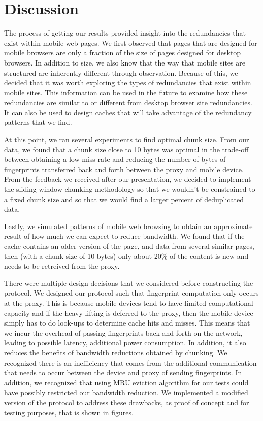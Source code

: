 \section{Discussion}
\label{sec:discussion}
The process of getting our results provided insight into the redundancies that exist within mobile web pages. We first observed that pages that are designed for mobile browsers are only a fraction of the size of pages designed for desktop browsers. In addition to size, we also know that the way that mobile sites are structured are inherently different through observation. Because of this, we decided that it was worth exploring the types of redundancies that exist within mobile sites. This information can be used in the future to examine how these redundancies are similar to or different from desktop browser site redundancies. It can also be used to design caches that will take advantage of the redundancy patterns that we find. 

At this point, we ran several experiments to find optimal chunk size. From our data, we found that a chunk size close to 10 bytes was optimal in the trade-off between obtaining a low miss-rate and reducing the number of bytes of fingerprints transferred back and forth between the proxy and mobile device. From the feedback we received after our presentation, we decided to implement the sliding window chunking methodology so that we wouldn't be constrained to a fixed chunk size and so that we would find a larger percent of deduplicated data. 

Lastly, we simulated patterns of mobile web browsing to obtain an approximate result of how much we can expect to reduce bandwidth. We found that if the cache contains an older version of the page, and data from several similar pages, then (with a chunk size of 10 bytes) only about 20\% of the content is new and needs to be retreived from the proxy. 

There were multiple design decisions that we considered before constructing the protocol. We designed our protocol such that fingerprint computation only occurs at the proxy. This is because mobile devices tend to have limited computational capacity and if the heavy lifting is deferred to the proxy, then the mobile device simply has to do look-ups to determine cache hits and misses. This means that we incur the overhead of passing fingerprints back and forth on the network, leading to possible latency, additional power consumption. In addition, it also reduces the benefits of bandwidth reductions obtained by chunking. We recognized there is an inefficiency that comes from the additional communication that needs to occur between the device and proxy of sending fingerprints. In addition, we recognized that using MRU eviction algorithm for our tests could have possibly restricted our bandwidth reduction. We implemented a modified version of the protocol to address these drawbacks, as proof of concept and for testing purposes, that is shown in figures. 

